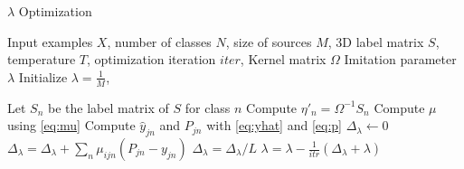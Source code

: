 \begin{algorithm}
	\caption{$\lambda$ Optimization}\label{alg:lambda}
\begin{algorithmic}
	\Require Input examples $X$, number of classes $N$, size of sources $M$, 3D label matrix $S$, temperature $T$, optimization iteration $iter$, Kernel matrix $\Omega$
    \Ensure Imitation parameter $\lambda$
    \State Initialize $\lambda = \frac{1}{M}$, 
    
    \State Let $S_n$ be the label matrix of $S$ for class $n$
    \State Compute $\eta'_n=\Omega^{-1}S_n$ 
    \EndFor
    \State Compute $\mu$ using \eqref{eq:mu}
	    \State Compute $\hat{y}_{jn}$ and $P_{jn}$ with \eqref{eq:yhat}  and \eqref{eq:p}
	    \State $\Delta_{\lambda} \leftarrow 0$
		    \State $\Delta_{\lambda} = \Delta_{\lambda}+\sum_n\mu_{ijn}\left(P_{jn}-{y}_{jn}\right)$
	    \EndFor
	    \State $\Delta_{\lambda} =\Delta_{\lambda}/L$
	    \State $\lambda = \lambda - \frac{1}{itr}(\Delta_{\lambda}+\lambda)$
    \EndFor
\end{algorithmic}	
\end{algorithm}
